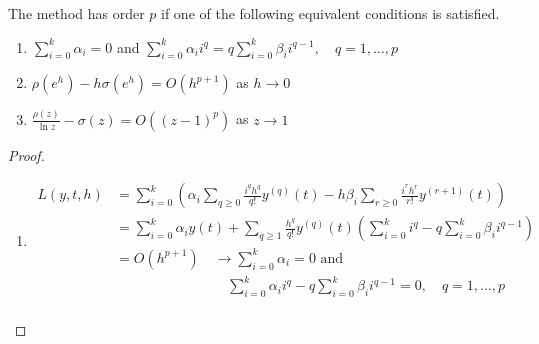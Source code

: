 \documentclass{article}
\theoremstyle{remark}
\begin{document}
 \begin{theorem}
   The method has order $p$ if one of the following equivalent conditions is satisfied.
   \begin{enumerate}[label=(\roman*)]
     \item $\sum_{i=0}^{k}  \alpha _{i} = 0$ and $\sum_{i=0}^{k}  \alpha _{i} i^{q} = q \sum_{i=0}^{k} \beta _{i} i^{q-1} , \quad  q = 1, \ldots, p    $
     \item $\rho \left( e^{h}  \right) - h \sigma \left( e^{h} \right) = O\left( h^{p+1} \right)$ as $h\to 0$
     \item $\displaystyle \frac{\rho \left( z \right)}{ \ln z}  - \sigma \left( z \right) = O\left( \left( z-1 \right)^{p} \right)$ as $z\to 1$
   \end{enumerate}
 \end{theorem}

 \begin{proof}
   \begin{enumerate}[label=(\roman*)]
     \item
  \[
    \begin{split}
 L\left( y,t, h \right)  & =  \sum_{i=0}^{k}  \left( \alpha _{i} \sum_{q \ge 0}^{}  \frac{i^{q} h^{q}}{ q!} y^{(q)} \left( t \right) - h \beta _{i} \sum_{r\ge 0}^{} \frac{i^{r} h^{r}}{r!} y^{(r+1)} \left( t \right)   \right) \\
 &= \sum_{i=0}^{k}  \alpha _{i}y\left( t \right) + \sum_{q\ge1}^{} \frac{h^{q}}{q!} y^{(q)} \left( t \right) \left( \sum_{i=0}^{k}  i^{q} - q \sum_{i=0}^{k}  \beta _{i} i^{q-1} \right)   \\
 &= O\left( h^{p+1} \right) \quad \to  \sum_{i=0}^{k}  \alpha _{i} = 0\text{ and } \\
  &\quad \quad \quad \quad \quad \quad \quad \quad \sum_{i=0}^{k}  \alpha  _{i} i^{q} - q   \sum_{i=0}^{k}  \beta _{i} i^{q-1}   = 0 , \quad  q = 1, \ldots, p       \\
    \end{split} 
 \] 
   \end{enumerate}
 \end{proof}
\end{document}
